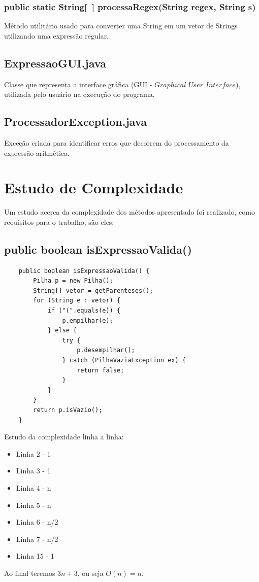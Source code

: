 \documentclass[a4paper,11pt]{article}
\begin{document}
\subsubsection{public static String[\ ] processaRegex(String regex, String s)}
Método utilitário usado para converter uma String em um vetor de Strings utilizando uma expressão regular.

\subsection{ExpressaoGUI.java}
Classe que representa a interface gráfica (GUI - $Graphical$ $User$ $Interface$), utilizada pelo usuário na execução do programa.

\subsection{ProcessadorException.java}
Exceção criada para identificar erros que decorrem do processamento da expressão aritmética.

\section{Estudo de Complexidade}
Um estudo acerca da complexidade dos métodos apresentado foi realizado, como requisitos para o trabalho, são eles:

\subsection{public boolean isExpressaoValida()}
\begin{lstlisting}
    public boolean isExpressaoValida() {
        Pilha p = new Pilha();
        String[] vetor = getParenteses();
        for (String e : vetor) {
            if ("(".equals(e)) {
                p.empilhar(e);
            } else {
                try {
                    p.desempilhar();
                } catch (PilhaVaziaException ex) {
                    return false;
                }
            }
        }
        return p.isVazio();
    }
\end{lstlisting}
Estudo da complexidade linha a linha:
\begin{itemize}
  \item Linha 2 - 1
  \item Linha 3 - 1
  \item Linha 4 - n
  \item Linha 5 - n
  \item Linha 6 - n/2
  \item Linha 7 - n/2
  \item Linha 15 - 1
\end{itemize}
Ao final teremos \(3n+3\), ou seja \(O(n)=n\).
\end{document}
